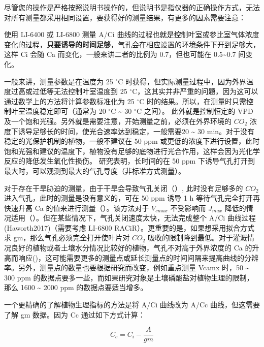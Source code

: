 \documentclass[]{krantz}
\theoremstyle{definition}
\theoremstyle{definition}
\theoremstyle{definition}
\theoremstyle{remark}
\begin{document}
尽管您的操作是严格按照说明书操作的，但说明书是指仪器的正确操作方式，无法对所有测量都采用相同设置，要获得好的测量结果，有更多的因素需要注意：

使用 LI-6400 或 LI-6800 测量 A/Ci
曲线的过程也就是控制叶室或参比室气体浓度变化的过程，\textbf{只要诱导的时间足够}，气孔会在相应设置的环境条件下开到足够大，这样
Ci 会随 Ca 而变化，一般来讲二者的比例为 0.7，但也可能在
0.5\textasciitilde{}0.7 间变化。

一般来讲，测量参数是在温度为 25 \(^{\circ}\)C
时获得，但实际测量过程中，因为外界温度过高或过低等无法控制叶室温度到 25
\(^{\circ}\)C，这其实并非严重的问题，因为这可以通过数学上的方法将计算参数标准化为
25 \(^{\circ}\)C
时的结果。所以，在测量时只需控制叶室温度稳定即可（通常为 20
\(^{\circ}\)C \textasciitilde{} 30 \(^{\circ}\)C 之间）。
此外就是控制恒定的 VPD
及一个饱和光强。另外就是需要注意，开始测量之前，必须在外界环境的
\(CO_2\) 浓度下诱导足够长的时间，使光合速率达到稳定，一般需要20
\textasciitilde{} 30 min。对于没有稳定的光保护机制的植物，一般不建议在
50 ppm
或更低的浓度下进行设置，此时饱和光强和建议的温度下，植物没有足够的底物进行光合作用，这样会因为光化学反应的降低发生氧化性损伤。\citet{centritto2003}
研究表明，长时间的在 50 ppm
下诱导气孔打开到最大时，可以观测到最大的气孔导度（非标准方式测量）。

对于存在干旱胁迫的测量，由于干旱会导致气孔关闭（\citet{lauteri2014}）,
此时没有足够多的 \(CO_2\) 进入气孔，此时的测量是没有意义的，可在 50 ppm
诱导 1 h 等待气孔完全打开再快速升高 Ca
的值来进行测量（\citet{centritto2003}）。该方法对于 \(V_{cmax}\)
不受影响而 \(J_{max}\)
降低的情况适用（\citet{Aganchich2009}）。但在某些情况下，气孔关闭速度太快，无法完成整个
A/Ci 曲线过程 (Haworth2017)（需要考虑 LI-6800
RACiR）。更重要的是，如果想采用拟合方式求
gm，那么气孔必须完全打开使叶片对 \(CO_2\)
吸收的限制降到最低。对于灌溉情况良好的植物或者土壤水分情况比较好的植物，气孔不对高于外界浓度的
Ca
的升高而响应(\citet{haworth2015coordination})，这可能需要更多的测量点或延长测量点的时间间隔来提高曲线的分辨率。另外，测量点的数量也要根据研究而改变，例如重点测量
Vcamx 时，50 \textasciitilde{} 300 ppm
的数据点要多一些，而如果研究对象是土壤磷酸盐对植物生理的限制，那么 1600
\textasciitilde{} 2000 ppm 的数据点要适当增多。

一个更精确的了解植物生理指标的方法是将 A/Ci 曲线改为 A/Cc
曲线，但这需要了解 gm 数据。因为 Cc 通过如下方式计算：

\begin{equation}
C_c = C_i - \frac{A}{gm}
\label{eq:notecc}
\end{equation}
\end{document}
